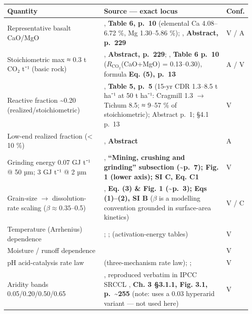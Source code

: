 \documentclass[openany]{book}
\newcounter{none} %
\begin{document}
{\def\LTcaptype{none} %
\begin{longtable}[]{@{}
  >{\raggedright\arraybackslash}p{}
  >{\raggedright\arraybackslash}p{}
  >{\raggedright\arraybackslash}p{}@{}}
\toprule\noalign{}
Quantity & Source --- exact locus & Conf. \\
\midrule\noalign{}
\endhead
\bottomrule\noalign{}
\endlastfoot
Representative basalt CaO/MgO & \citet{lewis2021}, \textbf{Table 6, p.~10} (elemental Ca 4.08--6.72 \%, Mg 1.30--5.86 \%); \citet{renforth2012}, \textbf{Abstract, p.~229} & V / A \\
Stoichiometric max ≈ 0.3 t CO₂ t⁻¹ (basic rock) & \citet{renforth2012}, \textbf{Abstract, p.~229}; \citet{lewis2021}, \textbf{Table 6 p.~10} (\(R_{\text{CO}_2}\)(CaO+MgO) = 0.13--0.30), formula \textbf{Eq. (5), p.~13} & A / V \\
Reactive fraction \textasciitilde0.20 (realized/stoichiometric) & \citet{lewis2021}, \textbf{Table 5, p.~5} (15-yr CDR 1.3--8.5 t ha⁻¹ at 50 t ha⁻¹: Cragmill 1.3 \(\rightarrow\) Tichum 8.5; ≈ 9--57 \% of stoichiometric); Abstract p.~1; §4.1 p.~13 & V \\
Low-end realized fraction (\textless{} 10 \%) & \citet{dupla2025}, \textbf{Abstract} & A \\
Grinding energy 0.07 GJ t⁻¹ @ 50 µm; 3 GJ t⁻¹ @ 2 µm & \citet{strefler2018}, \textbf{``Mining, crushing and grinding'' subsection (\textasciitilde p.~7); Fig. 1 (lower axis); SI C, Eq. C1} & V \\
Grain-size \(\rightarrow\) dissolution-rate scaling (\(\beta\approx0.35\)--0.5) & \citet{strefler2018}, \textbf{Eq. (3) \& Fig. 1 (\textasciitilde p.~3); Eqs (1)--(2), SI B} (\(\beta\) is a modelling convention grounded in surface-area kinetics) & V / C \\
Temperature (Arrhenius) dependence & \citet{gudbrandsson2011}; \citet{gislason2003}; \citet{palandri2004} (activation-energy tables) & V \\
Moisture / runoff dependence & \citet{whiteblum1995} & V \\
pH acid-catalysis rate law & \citet{palandri2004} (three-mechanism rate law); \citet{gislason2003}; \citet{whitebrantley2003} & V \\
Aridity bands 0.05/0.20/0.50/0.65 & \citet{unep1992}, reproduced verbatim in IPCC SRCCL \citep{ipcc2019}, \textbf{Ch. 3 §3.1.1, Fig. 3.1, p.~\textasciitilde255} (note: \citet{zomer2022} uses a 0.03 hyperarid variant --- not used here) & V \\

\end{longtable}}
\end{document}
